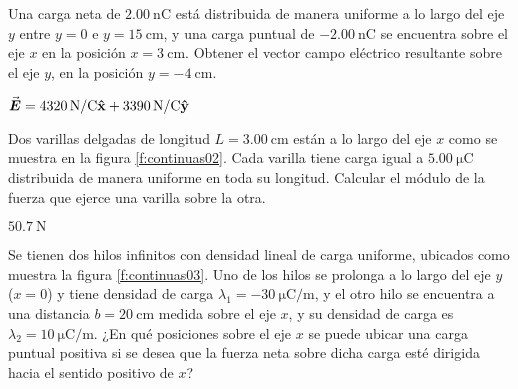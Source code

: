 %
\begin{Exercise}
  Una carga neta de $\SI{2.00}{\nano\coulomb}$ está distribuida de manera uniforme a lo largo del eje $y$ entre $y = 0$ e $y = \SI{15}{\centi\metre}$, y una carga puntual de $\SI{-2.00}{\nano\coulomb}$ se encuentra sobre el eje $x$ en la posición $x = \SI{3}{\centi\metre}$. Obtener el vector campo eléctrico resultante sobre el eje $y$, en la posición $y = \SI{-4}{\centi\metre}$.
\end{Exercise}
\begin{Answer}
  $\va*{E} = \SI{4320}{\newton/\coulomb}\vu{x} + \SI{3390}{\newton/\coulomb}\vu{y}$
\end{Answer}
%
\begin{Exercise}\label{p:continuas02}
  Dos varillas delgadas de longitud $L = \SI{3.00}{\centi\metre}$ están a lo largo del eje $x$ como se muestra en la figura \ref{f:continuas02}. Cada varilla tiene carga igual a $\SI{5.00}{\micro\coulomb}$ distribuida de manera uniforme en toda su longitud. Calcular el módulo de la fuerza que ejerce una varilla sobre la otra.
\end{Exercise}
\begin{Answer}
  $\SI{50.7}{\newton}$
\end{Answer}
%
\begin{center}
\end{center}
%
\begin{Exercise}\label{p:continuas03}
Se tienen dos hilos infinitos con densidad lineal de carga uniforme, ubicados como muestra la figura \ref{f:continuas03}. Uno de los hilos se prolonga a lo largo del eje $y$ ($x=0$) y tiene densidad de carga $\lambda_1 = \SI{-30}{\micro\coulomb/\metre}$, y el otro hilo se encuentra a una distancia $b = \SI{20}{\centi\metre}$ medida sobre el eje $x$, y su densidad de carga es $\lambda_2 = \SI{10}{\micro\coulomb/\metre}$. ¿En qué posiciones sobre el eje $x$ se puede ubicar una carga puntual positiva si se desea que la fuerza neta sobre dicha carga esté dirigida hacia el sentido positivo de $x$?
\end{Exercise}
